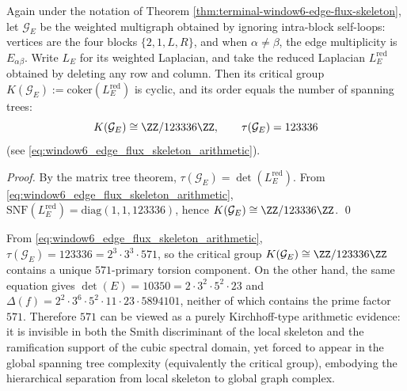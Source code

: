 \begin{corollary}\label{cor:window6-edge-flux-critical-group-cyclic}
Again under the notation of Theorem \ref{thm:terminal-window6-edge-flux-skeleton},
let \(\mathcal{G}_E\) be the weighted multigraph obtained by ignoring intra-block self-loops: vertices are the four blocks \(\{2,1,L,R\}\), and when \(\alpha\neq\beta\), the edge multiplicity is \(E_{\alpha\beta}\).
Write \(L_E\) for its weighted Laplacian, and take the reduced Laplacian \(L_E^{\mathrm{red}}\) obtained by deleting any row and column.
Then its critical group
\(
K(\mathcal{G}_E):=\mathrm{coker}(L_E^{\mathrm{red}})
\)
is cyclic, and its order equals the number of spanning trees:
\[
K(\mathcal{G}_E)\cong \ZZ/123336\ZZ,
\qquad
\tau(\mathcal{G}_E)=123336
\]
(see \eqref{eq:window6_edge_flux_skeleton_arithmetic}).
\end{corollary}
\begin{proof}
By the matrix tree theorem, \(\tau(\mathcal{G}_E)=\det(L_E^{\mathrm{red}})\).
From \eqref{eq:window6_edge_flux_skeleton_arithmetic},
\(\mathrm{SNF}(L_E^{\mathrm{red}})=\mathrm{diag}(1,1,123336)\),
hence \(K(\mathcal{G}_E)\cong \ZZ/123336\ZZ\). \qed
\end{proof}

\begin{remark}\label{rem:window6-kirchhoff-prime-571}
From \eqref{eq:window6_edge_flux_skeleton_arithmetic},
\(
\tau(\mathcal{G}_E)=123336=2^3\cdot 3^3\cdot 571
\),
so the critical group \(K(\mathcal{G}_E)\cong \ZZ/123336\ZZ\) contains a unique \(571\)-primary torsion component.
On the other hand, the same equation gives
\(
\det(E)=10350=2\cdot 3^2\cdot 5^2\cdot 23
\)
and
\(
\Delta(f)=2^2\cdot 3^6\cdot 5^2\cdot 11\cdot 23\cdot 5894101
\),
neither of which contains the prime factor \(571\).
Therefore \(571\) can be viewed as a purely Kirchhoff-type arithmetic evidence: it is invisible in both the Smith discriminant of the local skeleton and the ramification support of the cubic spectral domain, yet forced to appear in the global spanning tree complexity (equivalently the critical group), embodying the hierarchical separation from local skeleton to global graph complex.
\end{remark}

